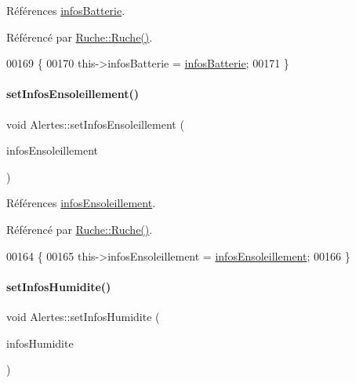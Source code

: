 Références \hyperlink{class_alertes_ad5c756a52ff4d6ae85cc0f03bd80582b}{infos\+Batterie}.



Référencé par \hyperlink{class_ruche_a8b4ee3752d984c5acee93b990db7939a}{Ruche\+::\+Ruche()}.


\begin{DoxyCode}
00169 \{
00170     this->infosBatterie = \hyperlink{class_alertes_ad5c756a52ff4d6ae85cc0f03bd80582b}{infosBatterie};
00171 \}
\end{DoxyCode}
\mbox{\label{class_alertes_a5379fc65522a77dc2cc110e489e1469d}} 
\paragraph{\texorpdfstring{set\+Infos\+Ensoleillement()}{setInfosEnsoleillement()}}
{\footnotesize\ttfamily void Alertes\+::set\+Infos\+Ensoleillement (\begin{DoxyParamCaption}\item[{\hyperlink{class_infos_ensoleillement}{Infos\+Ensoleillement} $\ast$}]{infos\+Ensoleillement }\end{DoxyParamCaption})}



Références \hyperlink{class_alertes_abd9b6ff4e9f1df3c360374cceb8d0601}{infos\+Ensoleillement}.



Référencé par \hyperlink{class_ruche_a8b4ee3752d984c5acee93b990db7939a}{Ruche\+::\+Ruche()}.


\begin{DoxyCode}
00164 \{
00165     this->infosEnsoleillement = \hyperlink{class_alertes_abd9b6ff4e9f1df3c360374cceb8d0601}{infosEnsoleillement};
00166 \}
\end{DoxyCode}
\mbox{\label{class_alertes_a05734ac9e97a9001de4ce9ef96235c87}} 
\paragraph{\texorpdfstring{set\+Infos\+Humidite()}{setInfosHumidite()}}
{\footnotesize\ttfamily void Alertes\+::set\+Infos\+Humidite (\begin{DoxyParamCaption}\item[{\hyperlink{class_infos_humidite}{Infos\+Humidite} $\ast$}]{infos\+Humidite }\end{DoxyParamCaption})}



